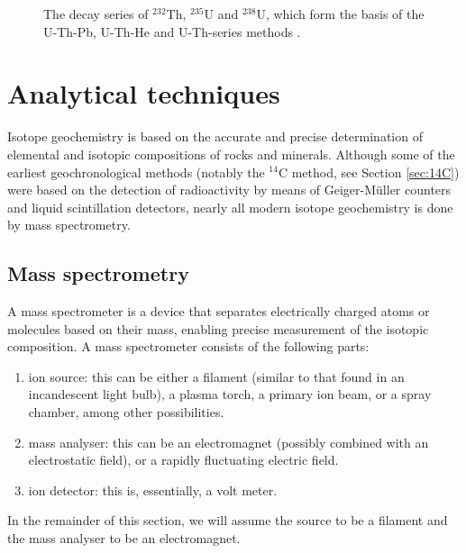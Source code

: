 \documentclass{book}
\begin{document}
\begin{figure}[!ht]
  \fi
  \caption{The decay series of $^{232}$Th, $^{235}$U and $^{238}$U,
    which form the basis of the U-Th-Pb, U-Th-He and U-Th-series methods
    \citep[modified from][]{allegre2008}.}
  \label{fig:U-Th-series}
\end{figure}

\chapter{Analytical techniques}

Isotope geochemistry is based on the accurate and precise
determination of elemental and isotopic compositions of rocks and
minerals.  Although some of the earliest geochronological methods
(notably the $^{14}$C method, see Section \ref{sec:14C}) were based on
the detection of radioactivity by means of Geiger-M\"{u}ller counters
and liquid scintillation detectors, nearly all modern isotope
geochemistry is done by mass spectrometry.

\section{Mass spectrometry}
\label{sec:mass-specs}

A mass spectrometer is a device that separates electrically charged
atoms or molecules based on their mass, enabling precise measurement
of the isotopic composition. A mass spectrometer consists of the
following parts:

\begin{enumerate}
\item ion source: this can be either a filament (similar to that found
  in an incandescent light bulb), a plasma torch, a primary ion beam,
  or a spray chamber, among other possibilities.
\item mass analyser: this can be an electromagnet (possibly combined
  with an electrostatic field), or a rapidly fluctuating electric
  field.
\item ion detector: this is, essentially, a volt meter.
\end{enumerate}

In the remainder of this section, we will assume the source to be a
filament and the mass analyser to be an electromagnet. \\
\end{document}
